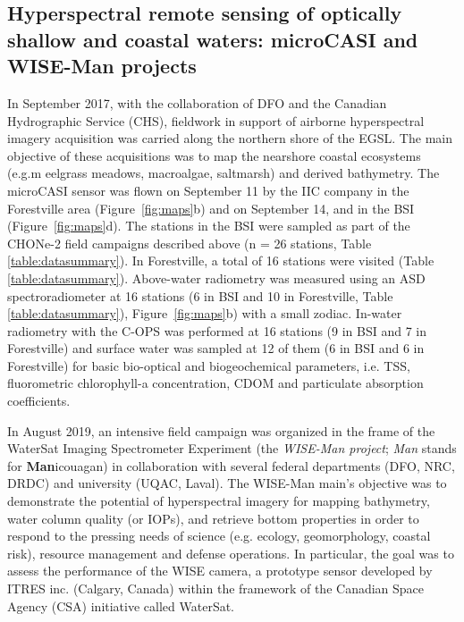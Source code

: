 \documentclass[essd, manuscript]{copernicus}
\begin{document}
\subsection{Hyperspectral remote sensing of optically shallow and coastal waters: microCASI and WISE-Man projects}
In September 2017, with the collaboration of DFO and the Canadian Hydrographic Service (CHS), fieldwork in support of airborne hyperspectral imagery acquisition was carried along the northern shore of the EGSL. The main objective of these acquisitions was to map the nearshore coastal ecosystems (e.g.m eelgrass meadows, macroalgae, saltmarsh) and derived bathymetry. The microCASI sensor was flown on September 11 by the IIC company in the Forestville area (Figure~\ref{fig:maps}b) and on September 14, and in the BSI (Figure~\ref{fig:maps}d). The stations in the BSI were sampled as part of the CHONe-2 field campaigns described above (n = 26 stations, Table \ref{table:datasummary}). In Forestville,  a total of 16 stations were visited (Table \ref{table:datasummary}). Above-water radiometry was measured using an ASD spectroradiometer at 16 stations (6 in BSI and 10 in Forestville, Table \ref{table:datasummary}), Figure~\ref{fig:maps}b) with a small zodiac. In-water radiometry with the C-OPS was performed at 16 stations (9 in BSI and 7 in Forestville) and surface water was sampled at 12 of them (6 in BSI and 6 in Forestville) for basic bio-optical and biogeochemical parameters, i.e. TSS, fluorometric chlorophyll-a concentration, CDOM and particulate absorption coefficients.
 
In August 2019, an intensive field campaign was organized in the frame of the WaterSat Imaging Spectrometer Experiment (the \textit{WISE-Man project}; \textit{Man} stands for \textbf{Man}icouagan) in collaboration with several federal departments (DFO, NRC, DRDC) and university (UQAC, Laval). %
The WISE-Man main's objective was to demonstrate the potential of hyperspectral imagery for mapping bathymetry, water column quality (or IOPs), and retrieve bottom properties in order to respond to the pressing needs of science (e.g. ecology, geomorphology, coastal risk), resource management and defense operations.  In particular, the goal was to assess the performance of the WISE camera, a prototype sensor developed by ITRES inc. (Calgary, Canada) within the framework of the Canadian Space Agency (CSA) initiative called WaterSat. 
 
\end{document}
